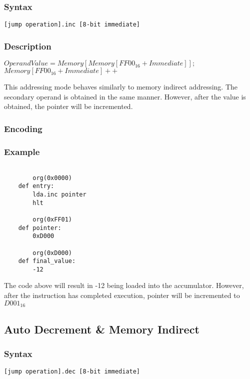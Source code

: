 \subsubsection{Syntax}
\begin{verbatim}[jump operation].inc [8-bit immediate]\end{verbatim}

\subsubsection{Description}
$OperandValue = Memory[Memory[FF00_{16} + Immediate]];$\\
$Memory[FF00_{16} + Immediate] ++$
\par This addressing mode behaves similarly to memory indirect addressing.
The secondary operand is obtained in the same manner.
However, after the value is obtained, the pointer will be incremented.

\subsubsection{Encoding}

\subsubsection{Example}
\begin{verbatim}

        org(0x0000)
    def entry:
        lda.inc pointer
        hlt

        org(0xFF01)
    def pointer:
        0xD000

        org(0xD000)
    def final_value:
        -12

\end{verbatim}
The code above will result in -12 being loaded into the accumulator.
However, after the instruction has completed execution, pointer will be incremented to $D001_{16}$
\pagebreak

\subsection{Auto Decrement \& Memory Indirect}\label{subsec:auto-decrement-&-memory-indirect-(dec)}
\subsubsection{Syntax}
\begin{verbatim}[jump operation].dec [8-bit immediate]\end{verbatim}

